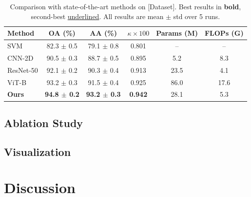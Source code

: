 \documentclass[journal,onecolumn,draftcls]{IEEEtran}
\begin{document}
\begin{table}[t]
  \centering
  \caption{Comparison with state-of-the-art methods on [Dataset].
           Best results in \textbf{bold}, second-best \underline{underlined}.
           All results are mean $\pm$ std over 5 runs.}
  \label{tab:main_results}
  \begin{tabular}{lccccc}
    \toprule
    \textbf{Method} & \textbf{OA (\%)} & \textbf{AA (\%)} &
    \textbf{$\kappa \times 100$} & \textbf{Params (M)} & \textbf{FLOPs (G)} \\
    \midrule
    SVM \cite{ref1}           & 82.3 $\pm$ 0.5 & 79.1 $\pm$ 0.8 &
    0.801 & -- & -- \\
    CNN-2D \cite{ref2}        & 90.5 $\pm$ 0.3 & 88.7 $\pm$ 0.5 &
    0.895 & 5.2 & 8.3 \\
    ResNet-50 \cite{ref3}     & 92.1 $\pm$ 0.2 & 90.3 $\pm$ 0.4 &
    0.913 & 23.5 & 4.1 \\
    ViT-B \cite{ref4}         & 93.2 $\pm$ 0.3 & 91.5 $\pm$ 0.4 &
    0.925 & 86.0 & 17.6 \\
    \textbf{Ours}             & \textbf{94.8 $\pm$ 0.2} &
    \textbf{93.2 $\pm$ 0.3} & \textbf{0.942} & 28.1 & 5.3 \\
    \bottomrule
  \end{tabular}
\end{table}

\subsection{Ablation Study}
\label{sec:exp-ablation}


\subsection{Visualization}
\label{sec:exp-visual}


\section{Discussion}
\label{sec:discussion}
\end{document}
